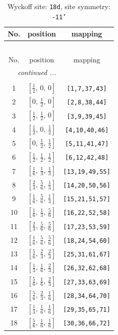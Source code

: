\documentclass[fleqn,8pt]{jsarticle}
\begin{document}
\begin{longtable}{ccc}
\caption{Wyckoff site: {\tt 18d}, site symmetry: {\tt -11'}}
 \\
 \hline \hline
No. & position & mapping \\ \hline \endfirsthead

\multicolumn{2}{l}{\tablename\ \thetable{}} \\
 \hline \hline
No. & position & mapping \\ \hline \endhead

 \hline \hline
\multicolumn{2}{r}{\footnotesize\it continued ...} \\ \endfoot

 \hline \hline
\multicolumn{2}{r}{} \\ \endlastfoot

1 & $\left[ \frac{1}{2},\, 0,\, 0 \right]$ & {\tt [1,7,37,43]} \\ \hline
2 & $\left[ 0,\, \frac{1}{2},\, 0 \right]$ & {\tt [2,8,38,44]} \\ \hline
3 & $\left[ \frac{1}{2},\, \frac{1}{2},\, 0 \right]$ & {\tt [3,9,39,45]} \\ \hline
4 & $\left[ \frac{1}{2},\, 0,\, \frac{1}{2} \right]$ & {\tt [4,10,40,46]} \\ \hline
5 & $\left[ 0,\, \frac{1}{2},\, \frac{1}{2} \right]$ & {\tt [5,11,41,47]} \\ \hline
6 & $\left[ \frac{1}{2},\, \frac{1}{2},\, \frac{1}{2} \right]$ & {\tt [6,12,42,48]} \\ \hline
7 & $\left[ \frac{1}{6},\, \frac{1}{3},\, \frac{1}{3} \right]$ & {\tt [13,19,49,55]} \\ \hline
8 & $\left[ \frac{2}{3},\, \frac{5}{6},\, \frac{1}{3} \right]$ & {\tt [14,20,50,56]} \\ \hline
9 & $\left[ \frac{1}{6},\, \frac{5}{6},\, \frac{1}{3} \right]$ & {\tt [15,21,51,57]} \\ \hline
10 & $\left[ \frac{1}{6},\, \frac{1}{3},\, \frac{5}{6} \right]$ & {\tt [16,22,52,58]} \\ \hline
11 & $\left[ \frac{2}{3},\, \frac{5}{6},\, \frac{5}{6} \right]$ & {\tt [17,23,53,59]} \\ \hline
12 & $\left[ \frac{1}{6},\, \frac{5}{6},\, \frac{5}{6} \right]$ & {\tt [18,24,54,60]} \\ \hline
13 & $\left[ \frac{5}{6},\, \frac{2}{3},\, \frac{2}{3} \right]$ & {\tt [25,31,61,67]} \\ \hline
14 & $\left[ \frac{1}{3},\, \frac{1}{6},\, \frac{2}{3} \right]$ & {\tt [26,32,62,68]} \\ \hline
15 & $\left[ \frac{5}{6},\, \frac{1}{6},\, \frac{2}{3} \right]$ & {\tt [27,33,63,69]} \\ \hline
16 & $\left[ \frac{5}{6},\, \frac{2}{3},\, \frac{1}{6} \right]$ & {\tt [28,34,64,70]} \\ \hline
17 & $\left[ \frac{1}{3},\, \frac{1}{6},\, \frac{1}{6} \right]$ & {\tt [29,35,65,71]} \\ \hline
18 & $\left[ \frac{5}{6},\, \frac{1}{6},\, \frac{1}{6} \right]$ & {\tt [30,36,66,72]} \\
\end{longtable}
\end{document}
